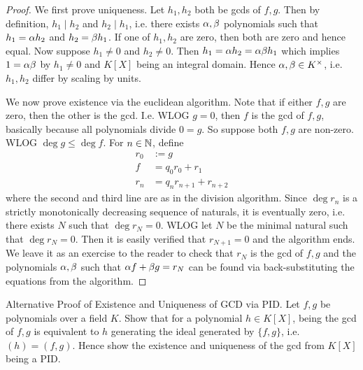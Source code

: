 \documentclass[../book.tex]{subfiles}
\begin{document}
\begin{proof}
    We first prove uniqueness. 
    Let $h_1, h_2$ both be gcds of $f, g$. 
    Then by definition, $h_1 \mid h_2$ and $h_2 \mid h_1$, i.e.
    there exists $\alpha, \beta$ polynomials such that 
    $h_1 = \alpha h_2$ and $h_2=\beta h_1$.
    If one of $h_1, h_2$ are zero, then both are zero and hence equal.
    Now suppose $h_1 \neq 0$ and $h_2 \neq 0$. 
    Then $h_1 = \alpha h_2 = \alpha \beta h_1$ which implies $1 = \alpha \beta$ 
    by $h_1 \neq 0$ and $K[X]$ being an integral domain. 
    Hence $\alpha, \beta \in K^\times$, i.e. $h_1, h_2$ differ by scaling by units.
    
    We now prove existence via the euclidean algorithm.
    Note that if either $f, g$ are zero, then the other is the gcd. 
    I.e. WLOG $g = 0$, then $f$ is the gcd of $f, g$, 
    basically because all polynomials divide $0 = g$. 
    So suppose both $f, g$ are non-zero. WLOG $\deg g \leq \deg f$.
    For $n \in \mathbb{N}$, define \begin{align*}
        r_0 &:= g \\
        f &= q_0 r_0 + r_1 \\
        r_n &= q_n r_{n+1} + r_{n+2}
    \end{align*}
    where the second and third line are as in the division algorithm. 
    Since $\deg r_n$ is a strictly monotonically decreasing sequence of naturals,
    it is eventually zero, i.e. there exists $N$ such that $\deg r_N = 0$.
    WLOG let $N$ be the minimal natural such that $\deg r_N = 0$. 
    Then it is easily verified that $r_{N+1} = 0$ and the algorithm ends.
    We leave it as an exercise to the reader to check that
    $r_N$ is the gcd of $f, g$ and 
    the polynomials $\alpha, \beta$ such that $\alpha f + \beta g = r_N$ 
    can be found via back-substituting the equations from the algorithm. 
\end{proof}
\begin{ex} Alternative Proof of Existence and Uniqueness of GCD via PID.
    Let $f, g$ be polynomials over a field $K$.
    Show that for a polynomial $h \in K[X]$, 
    being the gcd of $f, g$ is equivalent to 
    $h$ generating the ideal generated by $\{f, g\}$, i.e. $(h) = (f, g)$.
    Hence show the existence and uniqueness of the gcd from $K[X]$ being a PID.
\end{ex}
\end{document}

